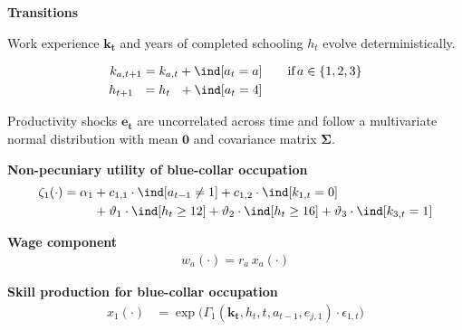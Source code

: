 \begin{frame}\textbf{Transitions}\vspace{0.3cm}

  Work experience $\bm{k_t}$  and years of completed schooling $h_t$ evolve deterministically.

  \begin{align*}
  k_{a,t+1} = k_{a,t} + \ind[a_t = a]  &\qquad \text{if}\, a \in \{1, 2, 3\} \\
  h_{t + 1\phantom{,a}} = h_{t\phantom{,a}} +   \ind[a_t = 4]  &\qquad\\
  \end{align*}

  Productivity shocks $\bm{e_t}$ are uncorrelated across time and follow a multivariate normal distribution with mean $\bm{0}$ and covariance matrix $\bm{\Sigma}$.

\end{frame}
\begin{frame}\textbf{Non-pecuniary utility of blue-collar occupation}\vspace{0.3cm}
%
  \begin{align*}\label{Non-pecuniary benefits}
  \zeta_{1}(\cdot)  = \alpha_1 & + c_{1,1} \cdot \ind[a_{t-1} \neq 1] + c_{1,2} \cdot \ind[k_{1,t} = 0] \\
                              & + \vartheta_1 \cdot \ind[h_t \geq 12] + \vartheta_2 \cdot \ind[h_t \geq 16] + \vartheta_3 \cdot \ind[k_{3,t} = 1]
  \end{align*}
\end{frame}
\begin{frame}\textbf{Wage component}\vspace{0.3cm}
%
\begin{align*}
w_{a}(\cdot) = r_{a} \, x_{a}(\cdot)
\end{align*}

\end{frame}

\begin{frame}\textbf{Skill production for blue-collar occupation}\vspace{0.3cm}
%
\begin{align}
    x_{1}(\cdot) & = \exp \big( \Gamma_{1}(\bm{k_t},  h_t, t, a_{t-1}, e_{j,1}) \cdot \epsilon_{1,t} \big) \nonumber
\end{align}
\end{frame}

